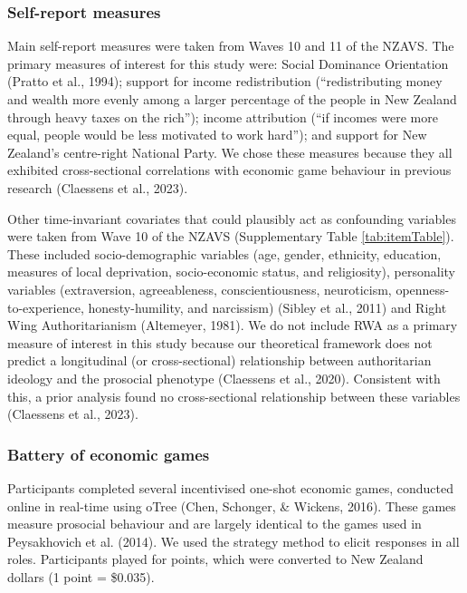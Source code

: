 \documentclass[
  man,floatsintext]{apa6}
\begin{document}
\hypertarget{self-report-measures}{%
\subsubsection{Self-report measures}\label{self-report-measures}}

Main self-report measures were taken from Waves 10 and 11 of the NZAVS. The
primary measures of interest for this study were: Social Dominance Orientation
(Pratto et al., 1994); support for income redistribution (``redistributing money and
wealth more evenly among a larger percentage of the people in New Zealand
through heavy taxes on the rich''); income attribution (``if incomes were more
equal, people would be less motivated to work hard''); and support for New
Zealand's centre-right National Party. We chose these measures because they all
exhibited cross-sectional correlations with economic game behaviour in
previous research (Claessens et al., 2023).

Other time-invariant covariates that could plausibly act as confounding
variables were taken from Wave 10 of the NZAVS (Supplementary Table
\ref{tab:itemTable}). These included socio-demographic variables (age, gender,
ethnicity, education, measures of local deprivation, socio-economic status, and
religiosity), personality variables (extraversion, agreeableness,
conscientiousness, neuroticism, openness-to-experience, honesty-humility, and
narcissism) (Sibley et al., 2011) and Right Wing Authoritarianism (Altemeyer, 1981). We
do not include RWA as a primary measure of interest in this study because our
theoretical framework does not predict a longitudinal (or cross-sectional)
relationship between authoritarian ideology and the prosocial phenotype
(Claessens et al., 2020). Consistent with this, a prior analysis found no
cross-sectional relationship between these variables (Claessens et al., 2023).

\hypertarget{battery-of-economic-games}{%
\subsubsection{Battery of economic games}\label{battery-of-economic-games}}

Participants completed several incentivised one-shot economic games, conducted
online in real-time using oTree (Chen, Schonger, \& Wickens, 2016). These games measure prosocial
behaviour and are largely identical to the games used in Peysakhovich et al. (2014). We
used the strategy method to elicit responses in all roles. Participants played
for points, which were converted to New Zealand dollars (1 point = \$0.035).
\end{document}
